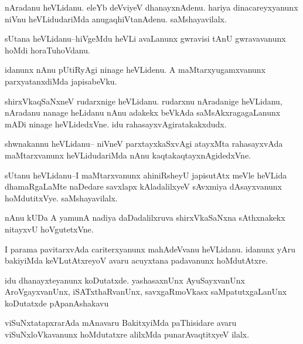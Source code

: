\documentclass{article}
\begin{document}
\begin{mn}%
nAradanu heVLidanu. eleYb deVviyeV dhanayxnAdenu. hariya dinacareyxyanunx niVnu 
heVLidudariMda anugaqhiVtanAdenu. saMshayavilalx.
\end{mn}

\begin{mn}%
sUtana heVLidanu--hiVgeMdu heVLi avaLanunx gwravisi tAnU gwravavanunx hoMdi horaTuhoVdanu.
\end{mn}

\begin{mn}%
idanunx nAnu pUtiRyAgi ninage heVLidenu. A maMtarxyugamxvanunx parxyatanxdiMda japisabeVku.
\end{mn}

\begin{mn}%
shirxVkaqSaNxneV rudarxnige heVLidanu. rudarxnu nAradanige heVLidanu, nAradanu nanage 
heLidanu nAnu adakekx beVkAda saMsAkxragagaLanunx mADi ninage heVLidedxVne. idu 
rahasayxvAgiratakakxdudx.
\end{mn}

\begin{mn}%
shwnakannu heVLidanu-- niVneV parxtayxkaSxvAgi atayxMta rahasayxvAda maMtarxvanunx 
heVLidudariMda nAnu kaqtakaqtayxnAgidedxVne.
\end{mn}

\begin{mn}%
sUtanu heVLidanu--I maMtarxvanunx ahiniRsheyU japisutAtx meVle heVLida dhamaRgaLaMte 
naDedare savxlapx kAladalilxyeV sAvxmiya dAsayxvanunx hoMdutitxVye. saMshayavilalx.
\end{mn}

\begin{mn}%
nAnu kUDa A yamunA nadiya daDadalilxruva shirxVkaSaNxna sAthxnakekx nitayxvU hoVgutetxVne.
\end{mn}

\begin{mn}%
I parama pavitarxvAda cariterxyanunx mahAdeVvanu heVLidanu. idanunx yAru bakiyiMda 
keVLutAtxreyoV avaru acuyxtana padavanunx hoMdutAtxre.
\end{mn}

\begin{mn}%
idu dhanayxteyanunx koDutatxde. yashasaxnUnx AyuSayxvanUnx AroVgayxvanUnx, iSATxthaRvanUnx,
savxgaRmoVkasx saMpatutxgaLanUnx koDutatxde pApanAshakavu
\end{mn}

\begin{mn}%
viSuNxtatapxrarAda mAnavaru BakitxyiMda paThisidare avaru viSuNxloVkavanunx hoMdutatxre 
alilxMda punarAvaqtitxyeV ilalx.
\end{mn}
\end{document}
